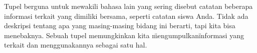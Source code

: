 Tupel berguna untuk mewakili bahasa lain yang sering disebut catatan \- beberapa informasi terkait yang dimiliki bersama, seperti catatan siswa Anda. Tidak ada deskripsi tentang apa yang masing-masing bidang ini berarti, tapi kita bisa menebaknya. Sebuah tupel memungkinkan kita \"mengumpulkan\" informasi yang terkait dan menggunakannya sebagai satu hal.

